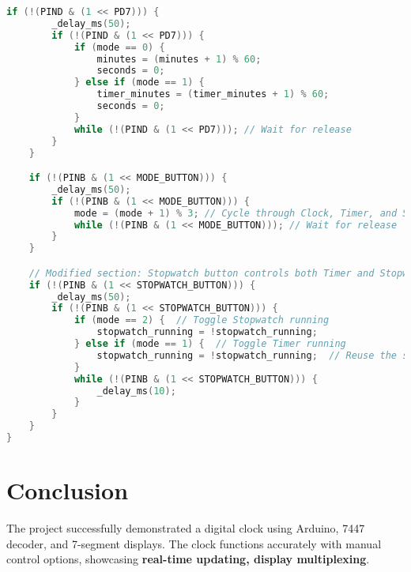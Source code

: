 \documentclass[a4paper,12pt]{article}
\theoremstyle{remark}
\begin{document}
\begin{lstlisting}[language=C++, caption= 'Code for Digital Clock']
    if (!(PIND & (1 << PD7))) {
        _delay_ms(50);
        if (!(PIND & (1 << PD7))) {
            if (mode == 0) {
                minutes = (minutes + 1) % 60;
                seconds = 0;
            } else if (mode == 1) {
                timer_minutes = (timer_minutes + 1) % 60;
                seconds = 0;
            }
            while (!(PIND & (1 << PD7))); // Wait for release
        }
    }

    if (!(PINB & (1 << MODE_BUTTON))) {
        _delay_ms(50);
        if (!(PINB & (1 << MODE_BUTTON))) {
            mode = (mode + 1) % 3; // Cycle through Clock, Timer, and Stopwatch
            while (!(PINB & (1 << MODE_BUTTON))); // Wait for release
        }
    }

    // Modified section: Stopwatch button controls both Timer and Stopwatch
    if (!(PINB & (1 << STOPWATCH_BUTTON))) {
        _delay_ms(50);
        if (!(PINB & (1 << STOPWATCH_BUTTON))) {
            if (mode == 2) {  // Toggle Stopwatch running
                stopwatch_running = !stopwatch_running;
            } else if (mode == 1) {  // Toggle Timer running
                stopwatch_running = !stopwatch_running;  // Reuse the same flag
            }
            while (!(PINB & (1 << STOPWATCH_BUTTON))) {
                _delay_ms(10);
            }
        }
    }
}
\end{lstlisting}



\section{Conclusion}
The project successfully demonstrated a digital clock using Arduino, 7447 decoder, and 7-segment displays. The clock functions accurately with manual control options, showcasing \textbf{real-time updating, display multiplexing}.
\end{document}
